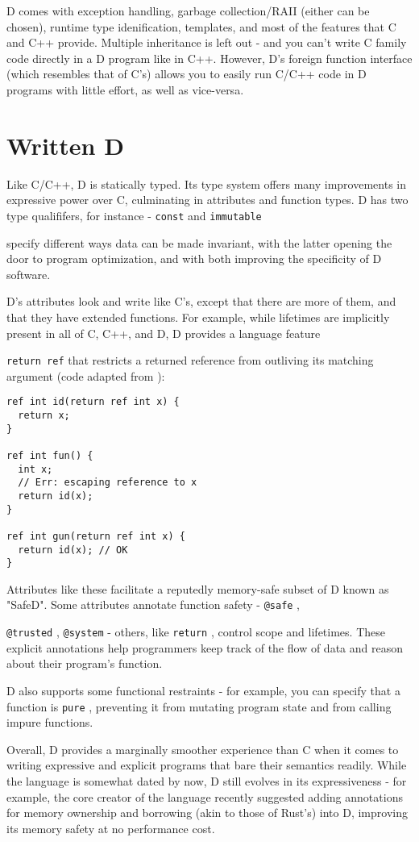 \documentclass[letterpaper,twocolumn,10pt]{article}
\newcommand{\code}[1]{
    \texttt{#1}
}
\begin{document}
D comes with exception handling, garbage collection/RAII (either can be chosen),
runtime type idenification, templates, and most of the features that C and C++
provide.  Multiple inheritance is left out - and you can't write C family code
directly in a D program like in C++.  However, D's foreign function interface
(which resembles that of C's) allows you to easily run C/C++ code in D programs
with little effort, as well as vice-versa.


\section*{Written D}

Like C/C++, D is statically typed.  Its type system offers many improvements in
expressive power over C, culminating in attributes and function types.  D has
two type qualififers, for instance - \code{const} and \code{immutable}
specify different ways data can be made invariant, with the latter opening
the door to program optimization, and with both improving the specificity of
D software.

D's attributes look and write like C's, except that there are more of them,
and that they have extended functions.  For example, while lifetimes are
implicitly present in all of C, C++, and D, D provides a language feature 
\code{return ref} that restricts a returned reference from outliving its 
matching argument (code adapted from \cite{function}):

\begin{verbatim}
ref int id(return ref int x) {
  return x;
}

ref int fun() {
  int x;
  // Err: escaping reference to x
  return id(x);
}

ref int gun(return ref int x) {
  return id(x); // OK
}
\end{verbatim}

Attributes like these facilitate a reputedly memory-safe subset of D 
known as "SafeD".  Some attributes annotate function safety - \code{@safe},
\code{@trusted}, \code{@system} - others, like \code{return}, control scope and 
lifetimes.  These explicit annotations help programmers keep track of the 
flow of data and reason about their program's function.

D also supports some functional restraints - for example, you can specify that
a function is \code{pure}, preventing it from mutating program state and from
calling impure functions.

Overall, D provides a marginally smoother experience than C when it 
comes to writing expressive and explicit programs that bare their 
semantics readily. While the language is somewhat dated by now, D still evolves
in its expressiveness - for example, the core creator of the language recently
\cite{ownerborrow} suggested adding annotations for memory 
ownership and borrowing (akin to those of Rust's) into D, 
improving its memory safety at no performance cost.
\end{document}
